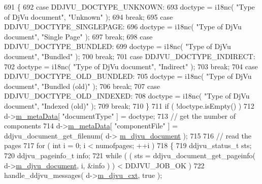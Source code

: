 \begin{DoxyCode}
691     \{
692         \textcolor{keywordflow}{case} DDJVU\_DOCTYPE\_UNKNOWN:
693             doctype = i18nc( \textcolor{stringliteral}{"Type of DjVu document"}, \textcolor{stringliteral}{"Unknown"} );
694             \textcolor{keywordflow}{break};
695         \textcolor{keywordflow}{case} DDJVU\_DOCTYPE\_SINGLEPAGE:
696             doctype = i18nc( \textcolor{stringliteral}{"Type of DjVu document"}, \textcolor{stringliteral}{"Single Page"} );
697             \textcolor{keywordflow}{break};
698         \textcolor{keywordflow}{case} DDJVU\_DOCTYPE\_BUNDLED:
699             doctype = i18nc( \textcolor{stringliteral}{"Type of DjVu document"}, \textcolor{stringliteral}{"Bundled"} );
700             \textcolor{keywordflow}{break};
701         \textcolor{keywordflow}{case} DDJVU\_DOCTYPE\_INDIRECT:
702             doctype = i18nc( \textcolor{stringliteral}{"Type of DjVu document"}, \textcolor{stringliteral}{"Indirect"} );
703             \textcolor{keywordflow}{break};
704         \textcolor{keywordflow}{case} DDJVU\_DOCTYPE\_OLD\_BUNDLED:
705             doctype = i18nc( \textcolor{stringliteral}{"Type of DjVu document"}, \textcolor{stringliteral}{"Bundled (old)"} );
706             \textcolor{keywordflow}{break};
707         \textcolor{keywordflow}{case} DDJVU\_DOCTYPE\_OLD\_INDEXED:
708             doctype = i18nc( \textcolor{stringliteral}{"Type of DjVu document"}, \textcolor{stringliteral}{"Indexed (old)"} );
709             \textcolor{keywordflow}{break};
710     \}
711     \textcolor{keywordflow}{if} ( !doctype.isEmpty() )
712         d->\hyperlink{classKDjVu_1_1Private_a48e70e9e1d6e964cacaf5bc8295dcba7}{m\_metaData}[ \textcolor{stringliteral}{"documentType"} ] = doctype;
713     \textcolor{comment}{// get the number of components}
714     d->\hyperlink{classKDjVu_1_1Private_a48e70e9e1d6e964cacaf5bc8295dcba7}{m\_metaData}[ \textcolor{stringliteral}{"componentFile"} ] = ddjvu\_document\_get\_filenum( d->
      \hyperlink{classKDjVu_1_1Private_a183f9508738c71bb5abab150619a5ccd}{m\_djvu\_document} );
715 
716     \textcolor{comment}{// read the pages}
717     \textcolor{keywordflow}{for} ( \textcolor{keywordtype}{int} i = 0; i < numofpages; ++i )
718     \{
719         ddjvu\_status\_t sts;
720         ddjvu\_pageinfo\_t info;
721         \textcolor{keywordflow}{while} ( ( sts = ddjvu\_document\_get\_pageinfo( d->\hyperlink{classKDjVu_1_1Private_a183f9508738c71bb5abab150619a5ccd}{m\_djvu\_document}, i, &info ) ) < 
      DDJVU\_JOB\_OK )
722             handle\_ddjvu\_messages( d->\hyperlink{classKDjVu_1_1Private_a5a52150a7ab9bbd584d6d73d68ae9ba1}{m\_djvu\_cxt}, \textcolor{keyword}{true} );

\end{DoxyCode}
